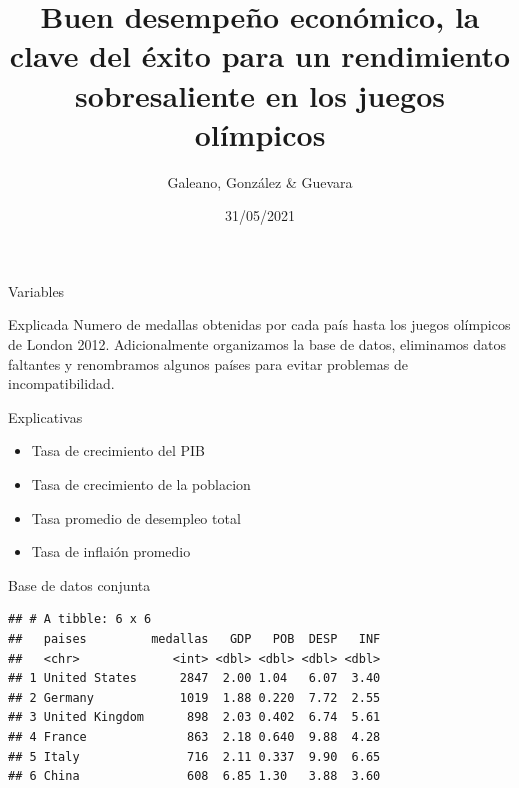 \documentclass[
  ignorenonframetext,
]{beamer}
\title{Buen desempeño económico, la clave del éxito para un rendimiento
sobresaliente en los juegos olímpicos}
\author{Galeano, González \& Guevara}
\date{31/05/2021}
\providecommand{\tightlist}{%
  \setlength{\itemsep}{0pt}\setlength{\parskip}{0pt}}
\begin{document}
\frame{\titlepage}

\begin{frame}{Variables}
\protect\hypertarget{variables}{}
\begin{block}{Explicada}
\protect\hypertarget{explicada}{}
Numero de medallas obtenidas por cada país hasta los juegos olímpicos de
London 2012. Adicionalmente organizamos la base de datos, eliminamos
datos faltantes y renombramos algunos países para evitar problemas de
incompatibilidad.
\end{block}

\begin{block}{Explicativas}
\protect\hypertarget{explicativas}{}
\begin{itemize}
\tightlist
\item
  Tasa de crecimiento del PIB
\item
  Tasa de crecimiento de la poblacion
\item
  Tasa promedio de desempleo total
\item
  Tasa de inflaión promedio
\end{itemize}
\end{block}
\end{frame}

\begin{frame}[fragile]{Base de datos conjunta}
\protect\hypertarget{base-de-datos-conjunta}{}
\begin{verbatim}
## # A tibble: 6 x 6
##   paises         medallas   GDP   POB  DESP   INF
##   <chr>             <int> <dbl> <dbl> <dbl> <dbl>
## 1 United States      2847  2.00 1.04   6.07  3.40
## 2 Germany            1019  1.88 0.220  7.72  2.55
## 3 United Kingdom      898  2.03 0.402  6.74  5.61
## 4 France              863  2.18 0.640  9.88  4.28
## 5 Italy               716  2.11 0.337  9.90  6.65
## 6 China               608  6.85 1.30   3.88  3.60
\end{verbatim}
\end{frame}
\end{document}
